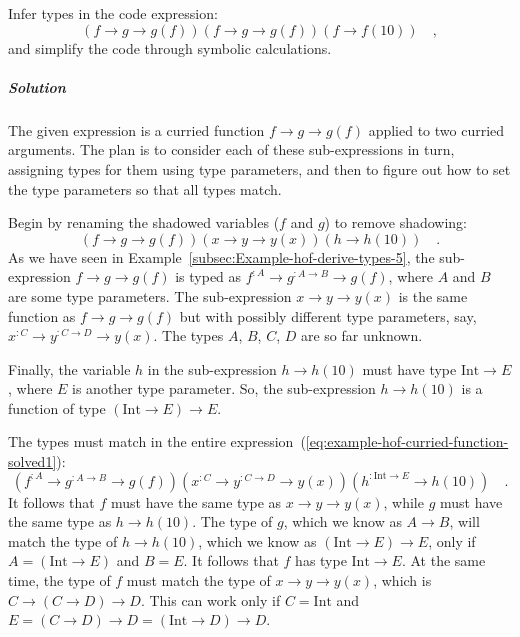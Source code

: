 Infer types in the code expression:
\[
\left(f\rightarrow g\rightarrow g(f)\right)\left(f\rightarrow g\rightarrow g(f)\right)\left(f\rightarrow f(10)\right)\quad,
\]
and simplify the code through symbolic calculations.

\subparagraph{Solution}

The given expression is a curried function $f\rightarrow g\rightarrow g(f)$
applied to two curried arguments. The plan is to consider each of
these sub-expressions in turn, assigning types for them using type
parameters, and then to figure out how to set the type parameters
so that all types match.

Begin by renaming the shadowed variables ($f$ and $g$) to remove
shadowing:
\begin{equation}
\left(f\rightarrow g\rightarrow g(f)\right)\left(x\rightarrow y\rightarrow y(x)\right)\left(h\rightarrow h(10)\right)\quad.\label{eq:example-hof-curried-function-solved1}
\end{equation}
 As we have seen in Example~\ref{subsec:Example-hof-derive-types-5},
the sub-expression $f\rightarrow g\rightarrow g(f)$ is typed as $f^{:A}\rightarrow g^{:A\rightarrow B}\rightarrow g(f)$,
where $A$ and $B$ are some type parameters. The sub-expression $x\rightarrow y\rightarrow y(x)$
is the same function as $f\rightarrow g\rightarrow g(f)$ but with
possibly different type parameters, say, $x^{:C}\rightarrow y^{:C\rightarrow D}\rightarrow y(x)$.
The types $A$, $B$, $C$, $D$ are so far unknown.

Finally, the variable $h$ in the sub-expression $h\rightarrow h(10)$
must have type $\text{Int}\rightarrow E$, where $E$ is another type
parameter. So, the sub-expression $h\rightarrow h(10)$ is a function
of type $\left(\text{Int}\rightarrow E\right)\rightarrow E$.

The types must match in the entire expression~(\ref{eq:example-hof-curried-function-solved1}):
\begin{equation}
(f^{:A}\rightarrow g^{:A\rightarrow B}\rightarrow g(f))(x^{:C}\rightarrow y^{:C\rightarrow D}\rightarrow y(x))(h^{:\text{Int}\rightarrow E}\rightarrow h(10))\quad.\label{eq:example-hof-curried-function-solved2}
\end{equation}
It follows that $f$ must have the same type as $x\rightarrow y\rightarrow y(x)$,
while $g$ must have the same type as $h\rightarrow h(10)$. The type
of $g$, which we know as $A\rightarrow B$, will match the type of
$h\rightarrow h(10)$, which we know as $\left(\text{Int}\rightarrow E\right)\rightarrow E$,
only if $A=\left(\text{Int}\rightarrow E\right)$ and $B=E$. It follows
that $f$ has type $\text{Int}\rightarrow E$. At the same time, the
type of $f$ must match the type of $x\rightarrow y\rightarrow y(x)$,
which is $C\rightarrow(C\rightarrow D)\rightarrow D$. This can work
only if $C=\text{Int}$ and $E=(C\rightarrow D)\rightarrow D=(\text{Int}\rightarrow D)\rightarrow D$.

